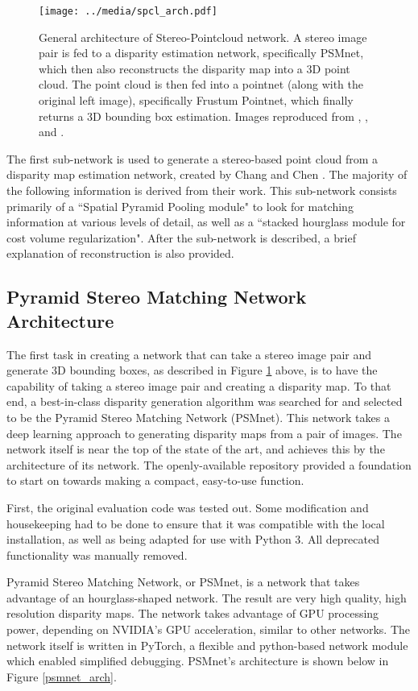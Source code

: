 \begin{figure}[ht]
	\centering
	\texttt{[image: ../media/spcl\_arch.pdf]}
	\caption{General architecture of Stereo-Pointcloud network. A stereo image pair is fed to a disparity estimation network, specifically PSMnet, which then also reconstructs the disparity map into a 3D point cloud. The point cloud is then fed into a pointnet (along with the original left image), specifically Frustum Pointnet, which finally returns a 3D bounding box estimation. Images reproduced from \cite{geiger_are_2012}, \cite{chang_pyramid_2018}, and \cite{qi_frustum_2017}.}
	\label{spcl_arch}
\end{figure}

The first sub-network is used to generate a stereo-based point cloud from a disparity map estimation network, created by Chang and Chen \cite{chang_pyramid_2018}. The majority of the following information is derived from their work. This sub-network consists primarily of a ``Spatial Pyramid Pooling module" to look for matching information at various levels of detail, as well as a ``stacked hourglass module for cost volume regularization". After the sub-network is described, a brief explanation of reconstruction is also provided. 

\subsection{Pyramid Stereo Matching Network Architecture}
The first task in creating a network that can take a stereo image pair and generate 3D bounding boxes, as described in Figure \ref{spcl_arch} above, is to have the capability of taking a stereo image pair and creating a disparity map. To that end, a best-in-class disparity generation algorithm was searched for and selected to be the Pyramid Stereo Matching Network (PSMnet). This network takes a deep learning approach to generating disparity maps from a pair of images. The network itself is near the top of the state of the art, and achieves this by the architecture of its network. The openly-available repository provided a foundation to start on towards making a compact, easy-to-use function.

First, the original evaluation code was tested out. Some modification and housekeeping had to be done to ensure that it was compatible with the local installation, as well as being adapted for use with Python 3. All deprecated functionality was manually removed.

Pyramid Stereo Matching Network, or PSMnet, is a network that takes advantage of an hourglass-shaped network. The result are very high quality, high resolution disparity maps. The network takes advantage of GPU processing power, depending on NVIDIA's GPU acceleration, similar to other networks. The network itself is written in PyTorch, a flexible and python-based network module which enabled simplified debugging. PSMnet's architecture is shown below in Figure \ref{psmnet_arch}.


